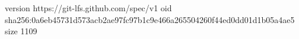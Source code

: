 version https://git-lfs.github.com/spec/v1
oid sha256:0a6eb45731d573acb2ae97fc97b1c9e466a265504260f44ed0dd01d1b05a4ae5
size 1109
